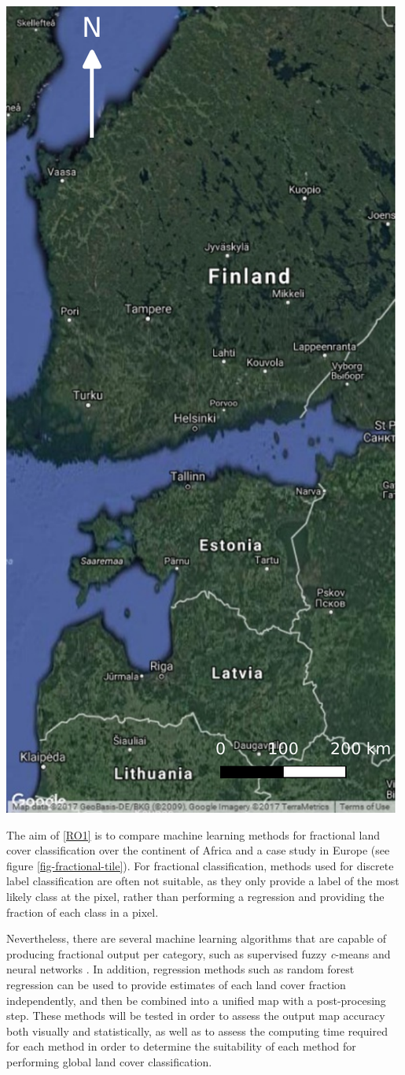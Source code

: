 \documentclass[10pt]{article}
\begin{document}
\begin{mdframed}[style=table,frametitle=\textbf{7. DETAILED DESCRIPTION OF THE RESEARCH PLAN} (max. 2500 words + 1 page literature list)]
{\begin{minipage}[t]{0.69\linewidth}
    \includegraphics[width=0.5\linewidth]{figures/fulltile-google.pdf}
    \label{fig-fractional-tile}
    \bigskip
  \end{minipage}
}

The aim of \ref{RO1} is to compare machine learning methods for fractional land cover classification over the continent of Africa and a case study in Europe (see figure \ref{fig-fractional-tile}). For fractional classification, methods used for discrete label classification are often not suitable, as they only provide a label of the most likely class at the pixel, rather than performing a regression and providing the fraction of each class in a pixel.

Nevertheless, there are several machine learning algorithms that are capable of producing fractional output per category, such as supervised fuzzy \textit{c}-means \citep{hengl_double_2004} and neural networks \citep{foody_fully_1997}. In addition, regression methods such as random forest regression \citep{breiman_random_2001} can be used to provide estimates of each land cover fraction independently, and then be combined into a unified map with a post-procesing step. These methods will be tested in order to assess the output map accuracy both visually and statistically, as well as to assess the computing time required for each method in order to determine the suitability of each method for performing global land cover classification.


\end{mdframed}
\end{document}
